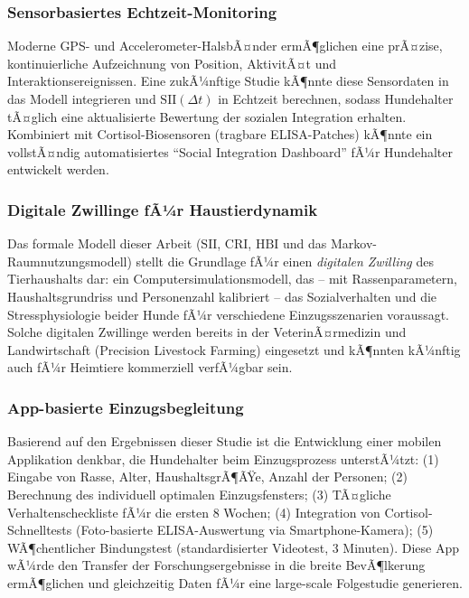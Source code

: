 ﻿\documentclass[12pt, a4paper]{article}
\theoremstyle{plain}
\theoremstyle{definition}
\theoremstyle{remark}
\newcommand{\HBI}{\mathrm{HBI}}
\newcommand{\SII}{\mathrm{SII}}
\newcommand{\CRI}{\mathrm{CRI}}
\newcommand{\dt}{\Delta t}
\begin{document}
\subsubsection{Sensorbasiertes Echtzeit-Monitoring}

Moderne GPS- und Accelerometer-HalsbÃ¤nder ermÃ¶glichen eine prÃ¤zise,
kontinuierliche Aufzeichnung von Position, AktivitÃ¤t und Interaktionsereignissen.
Eine zukÃ¼nftige Studie kÃ¶nnte diese Sensordaten in das Modell integrieren und
$\SII(\dt)$ in Echtzeit berechnen, sodass Hundehalter tÃ¤glich eine aktualisierte
Bewertung der sozialen Integration erhalten. Kombiniert mit Cortisol-Biosensoren
(tragbare ELISA-Patches) kÃ¶nnte ein vollstÃ¤ndig automatisiertes
``Social Integration Dashboard'' fÃ¼r Hundehalter entwickelt werden.

\subsubsection{Digitale Zwillinge fÃ¼r Haustierdynamik}

Das formale Modell dieser Arbeit ($\SII$, $\CRI$, $\HBI$ und das
Markov-Raumnutzungsmodell) stellt die Grundlage fÃ¼r einen \emph{digitalen
Zwilling} des Tierhaushalts dar: ein Computersimulationsmodell, das -- mit
Rassenparametern, Haushaltsgrundriss und Personenzahl kalibriert -- das
Sozialverhalten und die Stressphysiologie beider Hunde fÃ¼r verschiedene
Einzugsszenarien voraussagt. Solche digitalen Zwillinge werden bereits in
der VeterinÃ¤rmedizin und Landwirtschaft (Precision Livestock Farming)
eingesetzt und kÃ¶nnten kÃ¼nftig auch fÃ¼r Heimtiere kommerziell verfÃ¼gbar
sein.

\subsubsection{App-basierte Einzugsbegleitung}

Basierend auf den Ergebnissen dieser Studie ist die Entwicklung einer
mobilen Applikation denkbar, die Hundehalter beim Einzugsprozess unterstÃ¼tzt:
(1) Eingabe von Rasse, Alter, HaushaltsgrÃ¶ÃŸe, Anzahl der Personen;
(2) Berechnung des individuell optimalen Einzugsfensters;
(3) TÃ¤gliche Verhaltenscheckliste fÃ¼r die ersten 8 Wochen;
(4) Integration von Cortisol-Schnelltests (Foto-basierte ELISA-Auswertung
via Smartphone-Kamera);
(5) WÃ¶chentlicher Bindungstest (standardisierter Videotest, 3 Minuten).
Diese App wÃ¼rde den Transfer der Forschungsergebnisse in die breite
BevÃ¶lkerung ermÃ¶glichen und gleichzeitig Daten fÃ¼r eine large-scale
Folgestudie generieren.
\end{document}
